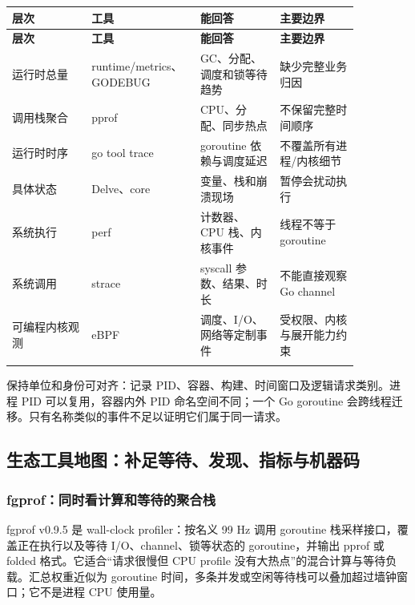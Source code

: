 \documentclass[UTF8,fontset=fandol,openany,11pt]{ctexbook}
\begin{document}
\begingroup\small\setlength{\tabcolsep}{4pt}
\begin{longtable}{>{\raggedright\arraybackslash}p{0.215\linewidth}>{\raggedright\arraybackslash}p{0.215\linewidth}>{\raggedright\arraybackslash}p{0.215\linewidth}>{\raggedright\arraybackslash}p{0.215\linewidth}}
\toprule
\textbf{层次} & \textbf{工具} & \textbf{能回答} & \textbf{主要边界} \\
\midrule
\endfirsthead
\toprule
\textbf{层次} & \textbf{工具} & \textbf{能回答} & \textbf{主要边界} \\
\midrule
\endhead
运行时总量 & runtime/metrics、GODEBUG & GC、分配、调度和锁等待趋势 & 缺少完整业务归因 \\
\addlinespace[3pt]
调用栈聚合 & pprof & CPU、分配、同步热点 & 不保留完整时间顺序 \\
\addlinespace[3pt]
运行时时序 & go tool trace & goroutine 依赖与调度延迟 & 不覆盖所有进程/内核细节 \\
\addlinespace[3pt]
具体状态 & Delve、core & 变量、栈和崩溃现场 & 暂停会扰动执行 \\
\addlinespace[3pt]
系统执行 & perf & 计数器、CPU 栈、内核事件 & 线程不等于 goroutine \\
\addlinespace[3pt]
系统调用 & strace & syscall 参数、结果、时长 & 不能直接观察 Go channel \\
\addlinespace[3pt]
可编程内核观测 & eBPF & 调度、I/O、网络等定制事件 & 受权限、内核与展开能力约束 \\
\addlinespace[3pt]
\bottomrule
\end{longtable}
\endgroup
保持单位和身份可对齐：记录 PID、容器、构建、时间窗口及逻辑请求类别。进程 PID 可以复用，容器内外 PID 命名空间不同；一个 Go goroutine 会跨线程迁移。只有名称类似的事件不足以证明它们属于同一请求。

\subsection{生态工具地图：补足等待、发现、指标与机器码}
\subsubsection{fgprof：同时看计算和等待的聚合栈}
fgprof v0.9.5 是 wall-clock profiler：按名义 99 Hz 调用 goroutine 栈采样接口，覆盖正在执行以及等待 I/O、channel、锁等状态的 goroutine，并输出 pprof 或 folded 格式。它适合“请求很慢但 CPU profile 没有大热点”的混合计算与等待负载。汇总权重近似为 goroutine 时间，多条并发或空闲等待栈可以叠加超过墙钟窗口；它不是进程 CPU 使用量。\cite{tools-fgprof}\cite{tools-fgprof-source}
\end{document}
